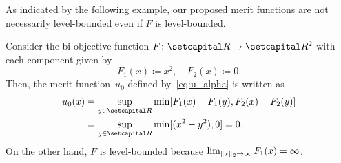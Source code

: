 \documentclass[../main]{subfiles}
\begin{document}
As indicated by the following example, our proposed merit functions are not necessarily level-bounded even if $F$ is level-bounded.
\begin{example}
    Consider the bi-objective function $F \colon \setR \to \setR^2$ with each component given by
    \[
        F_1(x) \coloneqq x^2, \quad F_2(x) \coloneqq 0.
    \]
    Then, the merit function~$u_0$ defined by~\cref{eq:u_alpha} is written as
    \begin{align}
        u_0(x) & = \sup_{y \in \setR} \min [ F_1(x) - F_1(y), F_2(x) - F_2(y) ] \\
             & = \sup_{y \in \setR} \min [ (x^2 - y^2), 0 ] = 0.
    \end{align}
    On the other hand, $F$ is level-bounded because $\lim_{\lVert x\rVert_2 \to \infty} F_1(x) = \infty$.
\end{example}
\end{document}
